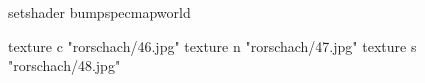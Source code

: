 setshader bumpspecmapworld

    texture c "rorschach/46.jpg"
    texture n "rorschach/47.jpg"
    texture s "rorschach/48.jpg"

